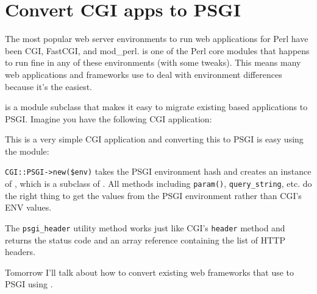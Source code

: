 \chapter{Convert CGI apps to PSGI}\label{day-6-convert-cgi-apps-to-psgi}

The most popular web server environments to run web applications for
Perl have been CGI, FastCGI, and mod\_perl.  is one of the Perl
core modules that happens to run fine in any of these environments (with
some tweaks). This means many web applications and frameworks use 
to deal with environment differences because it's the easiest.

\href{http://search.cpan.org/perldoc?CGI::PSGI}{} is a 
module subclass that makes it easy to migrate existing  based
applications to PSGI. Imagine you have the following CGI application:


This is a very simple CGI application and converting this to PSGI is
easy using the  module:


\lstinline!CGI::PSGI->new($env)! takes the PSGI environment hash and
creates an instance of , which is a subclass of . All
methods including \lstinline!param()!, \lstinline!query_string!, etc. do
the right thing to get the values from the PSGI environment rather than
CGI's ENV values.

The \lstinline!psgi_header! utility method works just like CGI's
\lstinline!header! method and returns the status code and an array
reference containing the list of HTTP headers.

Tomorrow I'll talk about how to convert existing web frameworks that use
 to PSGI using .


